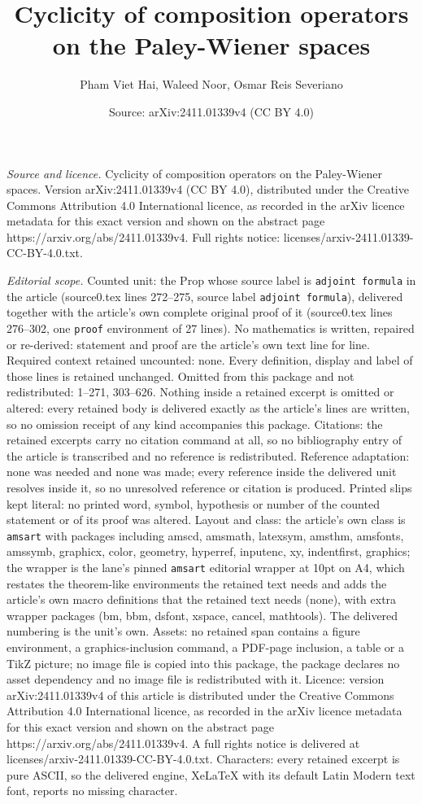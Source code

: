 \documentclass[10pt,a4paper]{amsart}
\title[Cyclicity of composition operators on the Paley-Wiener space]{Cyclicity of composition operators on the Paley-Wiener spaces}
\author{Pham Viet Hai, Waleed Noor, Osmar Reis Severiano}
\date{Source: arXiv:2411.01339v4 (CC BY 4.0)}
\begin{document}
\maketitle

\noindent\emph{Source and licence.} Cyclicity of composition operators on the Paley-Wiener spaces. Version arXiv:2411.01339v4 (CC BY 4.0), distributed under the Creative Commons Attribution 4.0 International licence, as recorded in the arXiv licence metadata for this exact version and shown on the abstract page https://arxiv.org/abs/2411.01339v4. Full rights notice: licenses/arxiv-2411.01339-CC-BY-4.0.txt.\par\smallskip

\noindent\textit{Editorial scope.} Counted unit: the Prop whose source label is \texttt{adjoint formula} in the article (source0.tex lines 272--275, source label \texttt{adjoint formula}), delivered together with the article's own complete original proof of it (source0.tex lines 276--302, one \texttt{proof} environment of 27 lines). No mathematics is written, repaired or re-derived: statement and proof are the article's own text line for line. Required context retained uncounted: none. Every definition, display and label of those lines is retained unchanged. Omitted from this package and not redistributed: 1--271, 303--626. Nothing inside a retained excerpt is omitted or altered: every retained body is delivered exactly as the article's lines are written, so no omission receipt of any kind accompanies this package. Citations: the retained excerpts carry no citation command at all, so no bibliography entry of the article is transcribed and no reference is redistributed. Reference adaptation: none was needed and none was made; every reference inside the delivered unit resolves inside it, so no unresolved reference or citation is produced. Printed slips kept literal: no printed word, symbol, hypothesis or number of the counted statement or of its proof was altered. Layout and class: the article's own class is \texttt{amsart} with packages including amscd, amsmath, latexsym, amsthm, amsfonts, amssymb, graphicx, color, geometry, hyperref, inputenc, xy, indentfirst, graphics; the wrapper is the lane's pinned \texttt{amsart} editorial wrapper at 10pt on A4, which restates the theorem-like environments the retained text needs and adds the article's own macro definitions that the retained text needs (none), with extra wrapper packages (bm, bbm, dsfont, xspace, cancel, mathtools). The delivered numbering is the unit's own. Assets: no retained span contains a figure environment, a graphics-inclusion command, a PDF-page inclusion, a table or a TikZ picture; no image file is copied into this package, the package declares no asset dependency and no image file is redistributed with it. Licence: version arXiv:2411.01339v4 of this article is distributed under the Creative Commons Attribution 4.0 International licence, as recorded in the arXiv licence metadata for this exact version and shown on the abstract page https://arxiv.org/abs/2411.01339v4. A full rights notice is delivered at licenses/arxiv-2411.01339-CC-BY-4.0.txt. Characters: every retained excerpt is pure ASCII, so the delivered engine, XeLaTeX with its default Latin Modern text font, reports no missing character.
\end{document}
